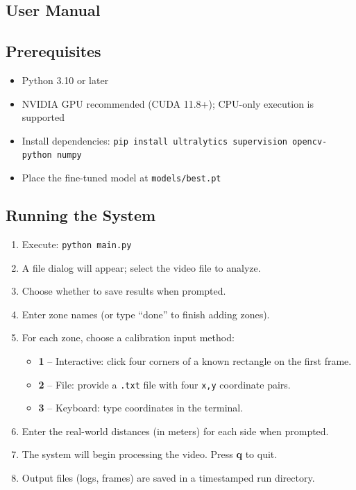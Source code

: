\documentclass[12pt]{report}
\begin{document}
\begin{appendices}
\chapter{User Manual}

\section{Prerequisites}

\begin{itemize}
    \item Python 3.10 or later
    \item NVIDIA GPU recommended (CUDA 11.8+); CPU-only execution is supported
    \item Install dependencies: \texttt{pip install ultralytics supervision opencv-python numpy}
    \item Place the fine-tuned model at \texttt{models/best.pt}
\end{itemize}

\section{Running the System}

\begin{enumerate}
    \item Execute: \texttt{python main.py}
    \item A file dialog will appear; select the video file to analyze.
    \item Choose whether to save results when prompted.
    \item Enter zone names (or type ``done'' to finish adding zones).
    \item For each zone, choose a calibration input method:
    \begin{itemize}
        \item \textbf{1} -- Interactive: click four corners of a known rectangle on the first frame.
        \item \textbf{2} -- File: provide a \texttt{.txt} file with four \texttt{x,y} coordinate pairs.
        \item \textbf{3} -- Keyboard: type coordinates in the terminal.
    \end{itemize}
    \item Enter the real-world distances (in meters) for each side when prompted.
    \item The system will begin processing the video. Press \textbf{q} to quit.
    \item Output files (logs, frames) are saved in a timestamped run directory.
\end{enumerate}


\end{appendices}
\end{document}
